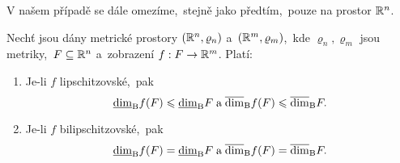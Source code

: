 V našem případě se dále omezíme,~stejně jako předtím,~pouze na prostor $\mathbb{R}^n$.

\begin{theorem}\label{thm:bc-dimenze-bi-lipschitzovska-zobrazeni}
    Nechť jsou dány metrické prostory $(\mathbb{R}^n,\varrho_n)$ a~$(\mathbb{R}^m,\varrho_m)$,~kde $\varrho_n,\varrho_m$ jsou metriky,~$F\subseteq\mathbb{R}^n$ a~zobrazení $f:F \rightarrow \mathbb{R}^m$. Platí:
    \begin{enumerate}[label=(\roman*)]
        \item\label{thm:bc-dimenze-lipschitz} Je-li $f$ lipschitzovské,~pak
        \[\underline{\dim}_\textup{B}{f(F)}\leqslant\underline{\dim}_\textup{B}{F}\;\text{a}\;\overline{\dim}_\textup{B}{f(F)}\leqslant\overline{\dim}_\textup{B}{F}.\]
        \item\label{thm:bc-dimenze-bilipschitz} Je-li $f$ bilipschitzovské,~pak
        \[\underline{\dim}_\textup{B}{f(F)}=\underline{\dim}_\textup{B}{F}\;\text{a}\;\overline{\dim}_\textup{B}{f(F)}=\overline{\dim}_\textup{B}{F}.\]
    \end{enumerate}
\end{theorem}
